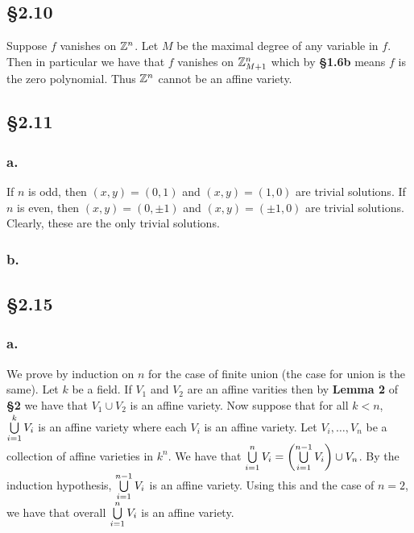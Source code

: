 \documentclass[letterpaper]{article}
\begin{document}
\subsection*{\S 2.10}

Suppose $f$ vanishes on $\mathbb{Z}^{n}$. Let $M$ be the maximal degree of any variable in $f$. Then in particular we have that $f$ vanishes on $\mathbb{Z}_{M + 1}^{n}$ which by \textbf{\S 1.6b} means $f$ is the zero polynomial. Thus $\mathbb{Z}^{n}$ cannot be an affine variety.

\subsection*{\S 2.11}

\subsubsection*{a.}

If $n$ is odd, then $(x, y) = (0, 1)$ and $(x, y) = (1, 0)$ are trivial solutions.
If $n$ is even, then $(x, y) = (0, \pm 1)$ and $(x, y) = (\pm 1, 0)$ are trivial solutions.
Clearly, these are the only trivial solutions.

\subsubsection*{b.}


\subsection*{\S 2.15}

\subsubsection*{a.}

We prove by induction on $n$ for the case of finite union (the case for union is the same). Let $k$ be a field. If $V_{1}$ and $V_{2}$ are an affine varities then by \textbf{Lemma 2} of \textbf{\S 2} we have that $V_{1} \cup V_{2}$ is an affine variety. Now suppose that for all $k < n$, $\bigcup\limits_{i = 1}^{k} V_{i}$ is an affine variety where each $V_{i}$ is an affine variety. Let $V_{i}, \ldots, V_{n}$ be a collection of affine varieties in $k^{n}$. We have that $\Bigcup_{i = 1}^{n} V_{i} = \pqty{\Bigcup_{i = 1}^{n - 1} V_{i}} \cup V_{n}$. By the induction hypothesis, $\bigcup\limits_{i = 1}^{n - 1} V_{i}$ is an affine variety. Using this and the case of $n = 2$, we have that overall $\bigcup\limits_{i = 1}^{n} V_{i}$ is an affine variety.
\end{document}
